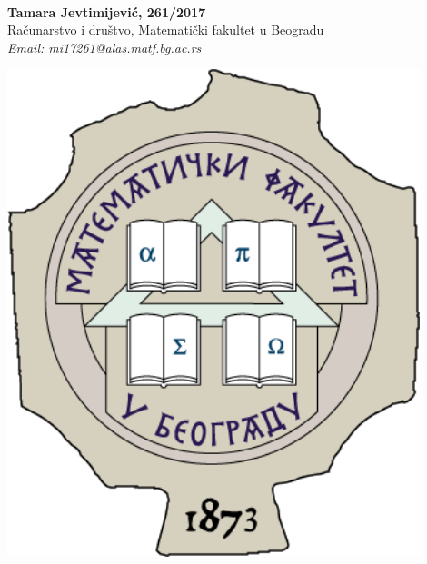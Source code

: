 \documentclass[a0,portrait]{a0poster}
\begin{document}


\begin{minipage}[b]{0.8\linewidth}
\color{NavyBlue}  
\color{Black}\\ %

\huge \textbf{Tamara Jevtimijević, 261/2017}\\[0.5cm] %
\huge Računarstvo i društvo, Matematički fakultet u Beogradu\\[0.4cm] %
\Large \textit{Email: mi17261@alas.matf.bg.ac.rs}\\
\end{minipage}
%
\begin{minipage}[b]{0.2\linewidth}
\includegraphics[width=12cm]{logo.png}\\
\end{minipage}
\end{document}
